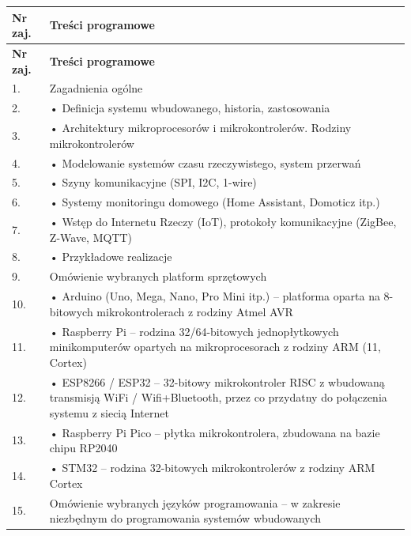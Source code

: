 \documentclass[12pt, a4paper]{article}
\newcommand{\thdrule}{\noalign{\global\setlength{\extrarowheight}{0pt}}}
\newcommand{\thdend}{\noalign{\global\setlength{\extrarowheight}{3pt}}}
\begin{document}
{\scriptsize
\begin{longtable}{m{1.5cm}m{14.5cm}}
\thdrule\toprule
\rowcolor{pjatkRed} {\color{white}\textbf{Nr zaj.}} & {\color{white}\textbf{Treści programowe}} \\
\midrule\thdend
\endfirsthead
\thdrule\toprule
\rowcolor{pjatkRed} {\color{white}\textbf{Nr zaj.}} & {\color{white}\textbf{Treści programowe}} \\
\midrule\thdend
\endhead
  \rowcolor{tableRowLight} 1. & Zagadnienia ogólne \\
  \rowcolor{tableRowAlt} 2. & • Definicja systemu wbudowanego, historia, zastosowania \\
  \rowcolor{tableRowLight} 3. & • Architektury mikroprocesorów i mikrokontrolerów. Rodziny mikrokontrolerów \\
  \rowcolor{tableRowAlt} 4. & • Modelowanie systemów czasu rzeczywistego, system przerwań \\
  \rowcolor{tableRowLight} 5. & • Szyny komunikacyjne (SPI, I2C, 1-wire) \\
  \rowcolor{tableRowAlt} 6. & • Systemy monitoringu domowego (Home Assistant, Domoticz itp.) \\
  \rowcolor{tableRowLight} 7. & • Wstęp do Internetu Rzeczy (IoT), protokoły komunikacyjne (ZigBee, Z-Wave, MQTT) \\
  \rowcolor{tableRowAlt} 8. & • Przykładowe realizacje \\
  \rowcolor{tableRowLight} 9. & Omówienie wybranych platform sprzętowych \\
  \rowcolor{tableRowAlt} 10. & • Arduino (Uno, Mega, Nano, Pro Mini itp.) – platforma oparta na 8-bitowych mikrokontrolerach z rodziny Atmel AVR \\
  \rowcolor{tableRowLight} 11. & • Raspberry Pi – rodzina 32/64-bitowych jednopłytkowych minikomputerów opartych na mikroprocesorach z rodziny ARM (11, Cortex) \\
  \rowcolor{tableRowAlt} 12. & • ESP8266 / ESP32 – 32-bitowy mikrokontroler RISC z wbudowaną transmisją WiFi / Wifi+Bluetooth, przez co przydatny do połączenia systemu z siecią Internet \\
  \rowcolor{tableRowLight} 13. & • Raspberry Pi Pico – płytka mikrokontrolera, zbudowana na bazie chipu RP2040 \\
  \rowcolor{tableRowAlt} 14. & • STM32 – rodzina 32-bitowych mikrokontrolerów z rodziny ARM Cortex \\
  \rowcolor{tableRowLight} 15. & Omówienie wybranych języków programowania – w zakresie niezbędnym do programowania systemów wbudowanych \\

\end{longtable}}
\end{document}
